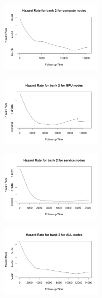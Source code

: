 \begin{t able}[t]
\begin{figure}
\centering
\includegraphics[width=0.45\textwidth]{images/haz_2_c.png}
\end{figure}

\begin{figure}
\centering
\includegraphics[width=0.45\textwidth]{images/haz_2_g.png}
\end{figure}

\begin{figure}
\centering
\includegraphics[width=0.45\textwidth]{images/haz_2_s.png}
\end{figure}

\begin{figure}
\centering
\includegraphics[width=0.45\textwidth]{images/haz_2_a.png}
\end{figure}


\end{t able}

